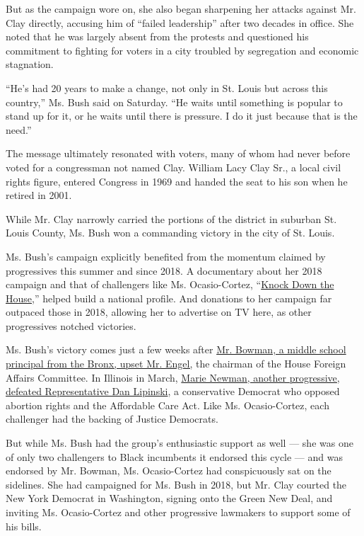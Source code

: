 But as the campaign wore on, she also began sharpening her attacks
against Mr. Clay directly, accusing him of ``failed leadership'' after
two decades in office. She noted that he was largely absent from the
protests and questioned his commitment to fighting for voters in a city
troubled by segregation and economic stagnation.

``He's had 20 years to make a change, not only in St. Louis but across
this country,'' Ms. Bush said on Saturday. ``He waits until something is
popular to stand up for it, or he waits until there is pressure. I do it
just because that is the need.''

The message ultimately resonated with voters, many of whom had never
before voted for a congressman not named Clay. William Lacy Clay Sr., a
local civil rights figure, entered Congress in 1969 and handed the seat
to his son when he retired in 2001.

While Mr. Clay narrowly carried the portions of the district in suburban
St. Louis County, Ms. Bush won a commanding victory in the city of St.
Louis.

Ms. Bush's campaign explicitly benefited from the momentum claimed by
progressives this summer and since 2018. A documentary about her 2018
campaign and that of challengers like Ms. Ocasio-Cortez,
``\href{https://www.nytimes3xbfgragh.onion/2019/04/30/movies/knock-down-the-house-review.html}{Knock
Down the House},'' helped build a national profile. And donations to her
campaign far outpaced those in 2018, allowing her to advertise on TV
here, as other progressives notched victories.

Ms. Bush's victory comes just a few weeks after
\href{https://www.nytimes3xbfgragh.onion/2020/07/17/nyregion/jamaal-bowman-eliot-engel.html}{Mr.
Bowman, a middle school principal from the Bronx, upset Mr. Engel,} the
chairman of the House Foreign Affairs Committee. In Illinois in March,
\href{https://www.nytimes3xbfgragh.onion/2020/03/18/us/politics/marie-newman-dan-lipinski-illinois.html}{Marie
Newman, another progressive, defeated Representative Dan Lipinski}, a
conservative Democrat who opposed abortion rights and the Affordable
Care Act. Like Ms. Ocasio-Cortez, each challenger had the backing of
Justice Democrats.

But while Ms. Bush had the group's enthusiastic support as well --- she
was one of only two challengers to Black incumbents it endorsed this
cycle --- and was endorsed by Mr. Bowman, Ms. Ocasio-Cortez had
conspicuously sat on the sidelines. She had campaigned for Ms. Bush in
2018, but Mr. Clay courted the New York Democrat in Washington, signing
onto the Green New Deal, and inviting Ms. Ocasio-Cortez and other
progressive lawmakers to support some of his bills.

